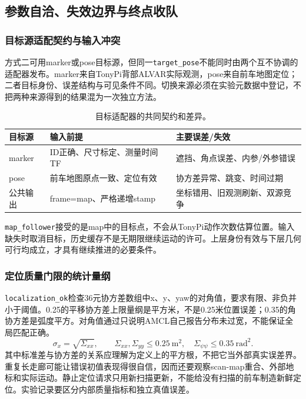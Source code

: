 \subsection{参数自洽、失效边界与终点收队}
\subsubsection{目标源适配契约与输入冲突}
方式二可用marker或pose目标源，但同一\texttt{target\_\allowbreak pose}不能同时由两个互不协调的适配器发布。marker来自TonyPi背部ALVAR实际观测，pose来自前车地图定位；二者目标身份、误差结构与可见条件不同。切换来源必须在实验元数据中登记，不把两种来源得到的结果混为一次独立方法。
\begin{table}[H]\centering\small\begin{tabularx}{\linewidth}{p{28mm}YY}\toprule 目标源 & 输入前提 & 主要误差/失效\\\midrule
marker & ID正确、尺寸标定、测量时间TF & 遮挡、角点误差、内参/外参错误\\
pose & 前车地图原点一致、定位有效 & 协方差异常、跳变、时间过期\\
公共输出 & frame=map、严格递增stamp & 坐标错用、旧观测刷新、双源竞争\\\bottomrule\end{tabularx}\caption{目标适配器的共同契约和差异。}\end{table}
\texttt{map\_\allowbreak follower}接受的是map中的目标点，不会从TonyPi动作次数估算位置。输入缺失时取消目标，历史缓存不是无期限继续运动的许可。上层身份有效与下层几何可行均成立，才具有继续推进的必要条件。

\subsubsection{定位质量门限的统计量纲}
\texttt{localization\_\allowbreak ok}检查36元协方差数组中x、y、yaw的对角值，要求有限、非负并小于阈值。0.25的平移协方差上限量纲是平方米，不是0.25米位置误差；0.35的角协方差是弧度平方。对角值通过只说明AMCL自己报告分布未过宽，不能保证全局匹配正确。
\begin{equation}
\sigma_x=\sqrt{\Sigma_{xx}},\qquad \Sigma_{xx},\Sigma_{yy}\le0.25\ \mathrm m^2,\quad\Sigma_{\psi\psi}\le0.35\ \mathrm{rad}^2.
\end{equation}
其中标准差与协方差的关系应理解为定义上的平方根，不把它当外部真实误差界。重复长走廊可能让错误初值表现得很自信，因而还要观察scan-map重合、外部地标和实际运动。静止定位请求只用新扫描更新，不能给没有扫描的前车制造新鲜定位。实验记录要区分内部质量指标和独立真值误差。

